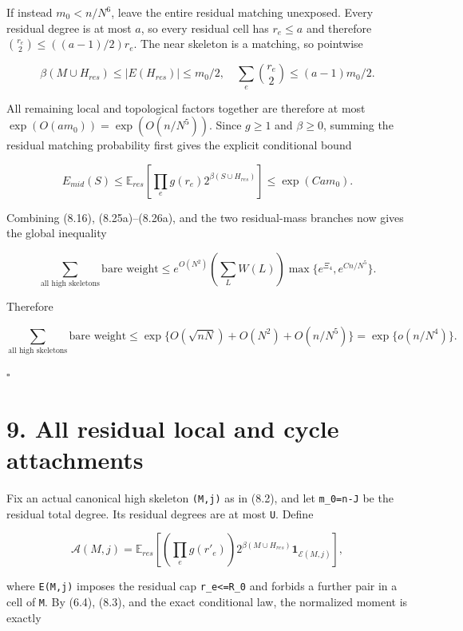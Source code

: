 \documentclass[
  11pt,
  a4paper,
]{article}
\begin{document}
If instead \(m_0<n/N^6\), leave the entire residual matching unexposed.
Every residual degree is at most \(a\), so every residual cell has
\(r_e\le a\) and therefore \(\binom{r_e}{2}\le((a-1)/2)r_e\). The near
skeleton is a matching, so pointwise

\[
 \beta(M\cup H_{res})\le|E(H_{res})|\le m_0/2,
 \quad
 \sum_e\binom{r_e}{2}\le(a-1)m_0/2.                    \tag{8.29}
\]

All remaining local and topological factors together are therefore at
most \(\exp(O(am_0))=\exp(O(n/N^5))\). Since \(g\ge1\) and
\(\beta\ge0\), summing the residual matching probability first gives the
explicit conditional bound

\[
 E_{mid}(S)
 \le\mathbb E_{res}\left[
      \prod_e g(r_e)2^{\beta(S\cup H_{res})}\right]
 \le\exp(Cam_0).                                         \tag{8.29a}
\]

Combining (8.16), (8.25a)--(8.26a), and the two residual-mass branches
now gives the global inequality

\[
 \sum_{\text{all high skeletons}}\text{bare weight}
 \le e^{O(N^2)}\left(\sum_LW(L)\right)
      \max\{e^{\Xi_4},e^{Cn/N^5}\}.                     \tag{8.29b}
\]

Therefore

\[
 \sum_{\text{all high skeletons}}\text{bare weight}
 \le\exp\{O(\sqrt{nN})+O(N^2)+O(n/N^5)\}
 =\exp\{o(n/N^4)\}.                                     \tag{8.30}
\]

\(\square\)

\section{9. All residual local and cycle
attachments}\label{all-residual-local-and-cycle-attachments}

Fix an actual canonical high skeleton \texttt{(M,j)} as in (8.2), and
let \texttt{m\_0=n-J} be the residual total degree. Its residual degrees
are at most \texttt{U}. Define

\[
 \mathcal A(M,j)=\mathbb E_{res}\left[
  \left(\prod_e g(r'_e)\right)
  2^{\beta(M\cup H_{res})}\mathbf1_{\mathcal E(M,j)}
 \right],                                                \tag{9.1}
\]

where \texttt{E(M,j)} imposes the residual cap
\texttt{r\textquotesingle{}\_e\textless{}=R\_0} and forbids a further
pair in a cell of \texttt{M}. By (6.4), (8.3), and the exact conditional
law, the normalized moment is exactly
\end{document}
